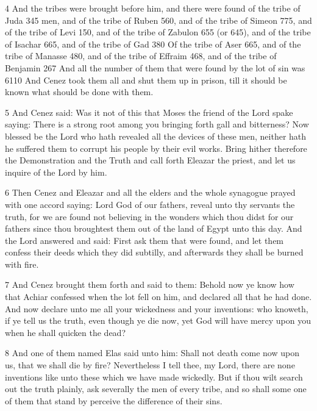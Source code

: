 \par 4 And the tribes were brought before him, and there were found of the tribe of Juda 345 men, and of the tribe of Ruben 560, and of the tribe of Simeon 775, and of the tribe of Levi 150, and of the tribe of Zabulon 655 (or 645), and of the tribe of Isachar 665, and of the tribe of Gad 380 Of the tribe of Aser 665, and of the tribe of Manasse 480, and of the tribe of Effraim 468, and of the tribe of Benjamin 267 And all the number of them that were found by the lot of sin was 6110 And Cenez took them all and shut them up in prison, till it should be known what should be done with them.

\par 5 And Cenez said: Was it not of this that Moses the friend of the Lord spake saying: There is a strong root among you bringing forth gall and bitterness? Now blessed be the Lord who hath revealed all the devices of these men, neither hath he suffered them to corrupt his people by their evil works. Bring hither therefore the Demonstration and the Truth and call forth Eleazar the priest, and let us inquire of the Lord by him. 

\par 6 Then Cenez and Eleazar and all the elders and the whole synagogue prayed with one accord saying: Lord God of our fathers, reveal unto thy servants the truth, for we are found not believing in the wonders which thou didst for our fathers since thou broughtest them out of the land of Egypt unto this day. And the Lord answered and said: First ask them that were found, and let them confess their deeds which they did subtilly, and afterwards they shall be burned with fire. 

\par 7 And Cenez brought them forth and said to them: Behold now ye know how that Achiar confessed when the lot fell on him, and declared all that he had done. And now declare unto me all your wickedness and your inventions: who knoweth, if ye tell us the truth, even though ye die now, yet God will have mercy upon you when he shall quicken the dead? 

\par 8 And one of them named Elas said unto him: Shall not death come now upon us, that we shall die by fire? Nevertheless I tell thee, my Lord, there are none inventions like unto these which we have made wickedly. But if thou wilt search out the truth plainly, ask severally the men of every tribe, and so shall some one of them that stand by perceive the difference of their sins. 

